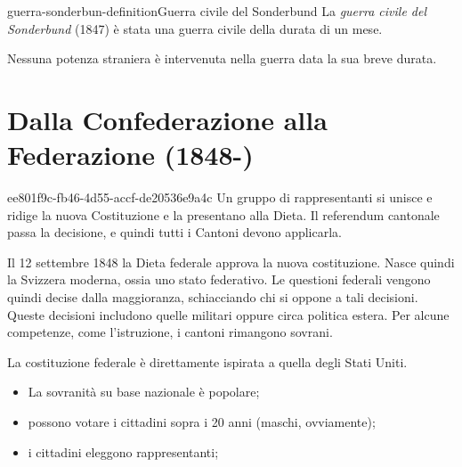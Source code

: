 \documentclass[preview]{standalone}
\begin{document}
\begin{snippetdefinition}{guerra-sonderbun-definition}{Guerra civile del Sonderbund}
    La \textit{guerra civile del Sonderbund} (1847) è stata una guerra civile
    della durata di un mese.
\end{snippetdefinition}

\begin{plainhtml}
    Nessuna potenza straniera è intervenuta nella guerra data la sua breve durata.
\end{plainhtml}

\section{Dalla Confederazione alla Federazione (1848-)}

\begin{snippet}{ee801f9c-fb46-4d55-accf-de20536e9a4c}
    Un gruppo di rappresentanti si unisce e ridige la nuova Costituzione e la presentano alla Dieta.
    Il referendum cantonale passa la decisione, e quindi tutti i Cantoni devono applicarla.
    
    Il 12 settembre 1848 la Dieta federale approva la nuova costituzione.
    Nasce quindi la Svizzera moderna, ossia uno stato federativo.
    Le questioni federali vengono quindi decise dalla maggioranza, schiacciando chi si oppone a tali decisioni.
    Queste decisioni includono quelle militari oppure circa politica estera.
    Per alcune competenze, come l'istruzione, i cantoni rimangono sovrani.
    
    La costituzione federale è direttamente ispirata a quella degli Stati Uniti.
    \begin{itemize}
        \item La sovranità su base nazionale è popolare;
        \item possono votare i cittadini sopra i 20 anni (maschi, ovviamente);
        \item i cittadini eleggono rappresentanti;
    \end{itemize}
    
\end{snippet}
\end{document}
